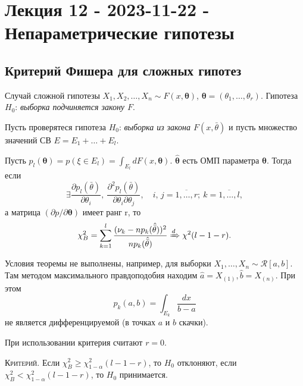 \section{Лекция 12 - 2023-11-22 - Непараметрические гипотезы}

\subsection{Критерий Фишера для сложных гипотез}

\begin{ex}
  Случай сложной гипотезы
  $X_1, X_2, \dots, X_n \sim F(x, \bm \theta)$, $\bm\theta = (\theta_1, \dots, \theta_r)$.
  Гипотеза $H_0$: \emph{выборка подчиняется закону $F$}.
\end{ex}

\begin{theorem}
  Пусть проверятеся гипотеза $H_0$: \emph{выборка из закона $F(x, \bar\theta)$}
  и
  пусть множество значений СВ $E = E_1 + \dots + E_l$.
  
  Пусть $p_l (\bm\theta) = p(\xi \in E_l) = \int_{E_l} dF(x, \bm\theta)$. 
  $\hat{\bm\theta}$ есть ОМП параметра $\bm\theta$.
  Тогда если
  \[
    \exists \dfrac{\partial p_l(\bar\theta)}{\partial \theta_i},\
    \dfrac{\partial^2 p_l(\bar\theta)}{\partial \theta_i \partial
    \theta_j},\quad i,\, j = \overline{1,\ldots, r};\ k=\overline{1,\ldots, l},
  \]
  а матрица $\left(\partial p/\partial \bm\theta\right)$ имеет ранг r, то
  \[
    \chi^2_B = \sum_{k=1}^l \dfrac{(\nu_k -
    np_k(\hat{\bar\theta}))^2}{np_k(\hat{\bar\theta})} \xRightarrow[]{d} \chi^2 (l-1-r).
  \]
\end{theorem}


\begin{remark}
  Условия теоремы не выполнены, например, для выборки $X_1, \dots, X_n \sim
  \mathscr R[a, b]$.
  Там методом максимального правдоподобия находим $\hat a = X_{(1)}, \hat b =
  X_{(n)}$. При этом
  \[
    p_k (a, b) = \int_{E_k} \frac{dx}{b-a}
  \]
  не является
  дифференцируемой (в точках $a$ и $b$ скачки).
\end{remark}

При использовании критерия считают $r = 0$.

\textsc{Критерий}. Если $\chi^2_B \geqslant \chi^2_{1-\alpha} (l-1-r)$, то $H_0$ отклоняют, если $\chi^2_B < \chi^2_{1-\alpha} (l-1-r)$, то $H_0$ принимается.

